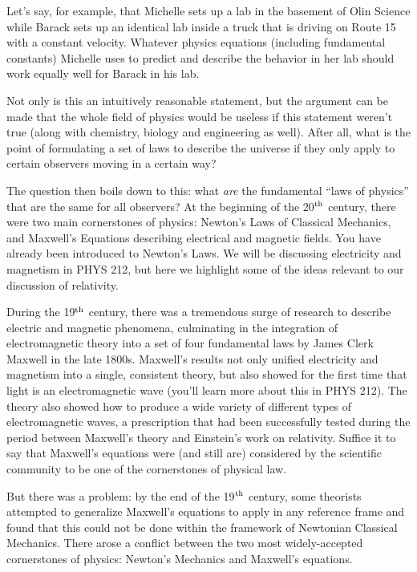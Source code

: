 \noindent Let's say, for example, that Michelle sets up a lab in the
basement of Olin Science while Barack sets up an identical lab inside
a truck that is driving on Route 15 with a constant velocity.
Whatever physics equations (including fundamental constants) Michelle
uses to predict and describe the behavior in her lab should work
equally well for Barack in his lab.

Not only is this an intuitively reasonable statement, but
the argument can be made that the whole field of physics would be
useless if this statement weren't true (along with chemistry, biology
and engineering as well).  After all, what is the point of formulating
a set of laws to describe the universe if they only apply to certain
observers moving in a certain way?
   
The question then boils down to this: what {\em are} the fundamental ``laws
of physics'' that are the same for all observers?  At the beginning of
the 20$^{\rm th}$ century, there were two main cornerstones of physics:
Newton's Laws of Classical Mechanics, and Maxwell's Equations
describing electrical and magnetic fields.  You have already been
introduced to Newton's Laws.  We will be discussing
electricity and magnetism in PHYS 212, but here we highlight some of
the ideas relevant to our discussion of relativity.
   
During the 19$^{\rm th}$ century, there was a tremendous surge of
research to describe electric and magnetic phenomena, culminating in
the integration of electromagnetic theory into a set of four
fundamental laws by James Clerk Maxwell in the late 1800s.  Maxwell's
results not only unified electricity and magnetism into a single,
consistent theory, but also showed for the first time that light is an
electromagnetic wave (you'll learn more about this in PHYS 212).  The
theory also showed how to produce a wide variety of different types of
electromagnetic waves, a prescription that had been successfully
tested during the period between Maxwell's theory and Einstein's work
on relativity.  Suffice it to say that Maxwell's equations were
 (and still are) considered by the scientific community to be one of
the cornerstones of physical law.
   
But there was a problem: by the end of the 19$^{\rm th}$ century, some
theorists 
attempted to generalize Maxwell's equations to apply in
any reference frame and found that this could not be done within the
framework of Newtonian Classical Mechanics.  There arose
a conflict between the two most widely-accepted cornerstones of
physics: Newton's Mechanics and Maxwell's equations.
   
